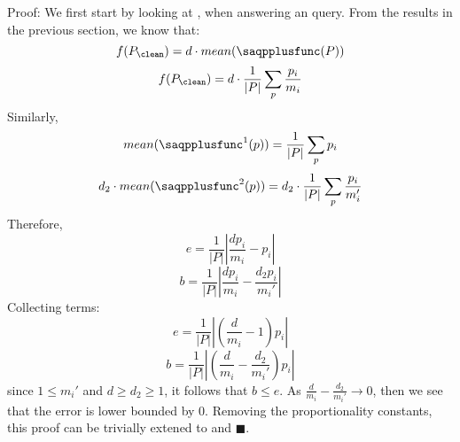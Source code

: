Proof: We first start by looking at \saqpplusfunc, when answering an \avgfunc query.
From the results in the previous section, we know that:
\[ f(P_{\clean}) = d \cdot mean(\saqpplusfunc(P)) \]
\[ f(P_{\clean}) = d \cdot \frac{1}{|P|} \sum_p \frac{p_i}{m_i} \]
Similarly,
\[ mean(\saqpplusfunc^{1}(p)) = \frac{1}{|P|} \sum_p p_i \]
\[ d_2 \cdot mean(\saqpplusfunc^{2}(p)) = d_2 \cdot \frac{1}{|P|} \sum_p \frac{p_i}{m_i'} \]
Therefore,
\[ e = \frac{1}{|P|} |\frac{dp_i}{m_i}-{p_i}| \]
\[ b = \frac{1}{|P|} |\frac{dp_i}{m_i}-\frac{d_2p_i}{m_i'}| \]
Collecting terms:
\[ e = \frac{1}{|P|} |(\frac{d}{m_i}-1)p_i| \]
\[ b = \frac{1}{|P|} |(\frac{d}{m_i}-\frac{d_2}{m_i'})p_i| \]
since $1 \le m_i'$ and $d \ge d_2 \ge 1$, it follows that $b \le e$.
As $\frac{d}{m_i}-\frac{d_2}{m_i'} \rightarrow 0$, then we see that the
error is lower bounded by 0.
Removing the proportionality constants, this proof can be trivially extened to \sumfunc and \countfunc $\blacksquare$.



